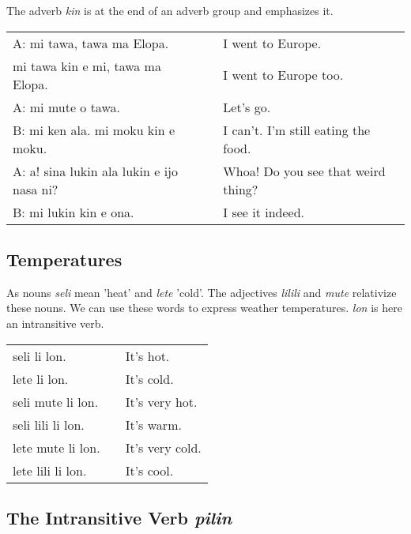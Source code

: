 {The adverb \textit{kin} is at the end of an adverb group and emphasizes it.

\begin{supertabular}{p{5,5cm}|ll}
A: mi tawa, tawa ma Elopa. && I went to Europe. \\
mi tawa kin e mi, tawa ma Elopa. && I went to Europe too. \\
A: mi mute o tawa. && Let's go. \\
B: mi ken ala. mi moku kin e moku. && I can't. I'm still eating the food. \\
A: a! sina lukin ala lukin e ijo nasa ni? && Whoa! Do you see that weird thing? \\
B: mi lukin kin e ona. && I see it indeed. \\
\end{supertabular} 

%
%
%
%
\subsection*{Temperatures}
%
%
As nouns \textit{seli} mean 'heat' and \textit{lete} 'cold'. 
The adjectives \textit{lilili} and \textit{mute} relativize these nouns. 
We can use these words to express weather temperatures. 
\textit{lon} is here an intransitive verb. 

\begin{supertabular}{p{5,5cm}|ll}
seli li lon. && It's hot. \\
lete li lon. && It's cold. \\
seli mute li lon. && It's very hot. \\
seli lili li lon. && It's warm. \\
lete mute li lon. && It's very cold. \\
lete lili li lon. && It's cool. \\
\end{supertabular} 

%
\subsection*{The Intransitive Verb \textit{pilin}}
%

}
